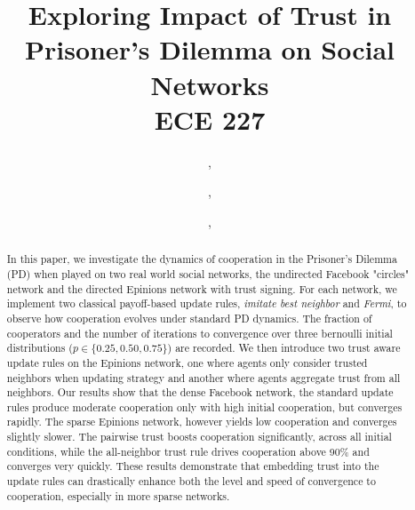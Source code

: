 \documentclass[journal]{IEEEtran}
\begin{document}
\title{Exploring Impact of Trust in Prisoner's Dilemma on Social Networks\\ \Large ECE 227}
        
    \author{
    ,

    \and
    
    ,
    \and
    
    ,
    }
    
\maketitle
\begin{abstract}
In this paper, we investigate the dynamics of cooperation in the Prisoner's Dilemma (PD) when played on two real world social networks, the undirected Facebook "circles" network and the directed Epinions network with trust signing.
For each network, we implement two classical payoff-based update rules, \emph{imitate best neighbor} and \emph{Fermi}, to observe how cooperation evolves under standard PD dynamics.
The fraction of cooperators and the number of iterations to convergence over three bernoulli initial distributions (\(p \in \{0.25, 0.50, 0.75\}\)) are recorded.
We then introduce two trust aware update rules on the Epinions network, one where agents only consider trusted neighbors when updating strategy and another where agents aggregate trust from all neighbors.
Our results show that the dense Facebook network, the standard update rules produce moderate cooperation only with high initial cooperation, but converges rapidly. 
The sparse Epinions network, however yields low cooperation and converges slightly slower.
The pairwise trust boosts cooperation significantly, across all initial conditions, while the all-neighbor trust rule drives cooperation above 90\% and converges very quickly.
These results demonstrate that embedding trust into the update rules can drastically enhance both the level and speed of convergence to cooperation, especially in more sparse networks.
\end{abstract}
\end{document}

